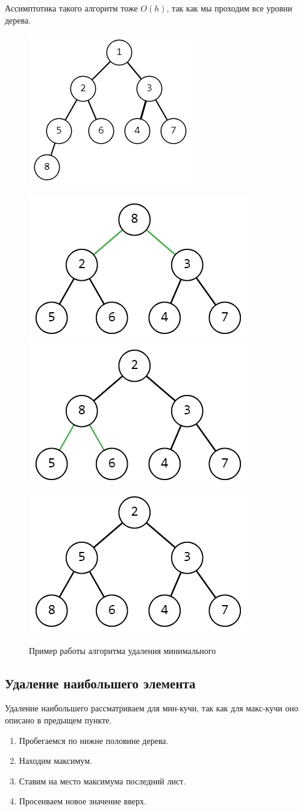 \documentclass{article}
\begin{document}
Ассимптотика такого алгоритм тоже $O(h)$, так как мы проходим все уровни дерева.

\begin{figure}[h]
    \centering
    \includegraphics[width=0.3\linewidth]{5.png}

    \includegraphics[width=0.3\linewidth]{6.png}
    \includegraphics[width=0.3\linewidth]{7.png}
    \includegraphics[width=0.3\linewidth]{8.png}
    \caption{Пример работы алгоритма удаления минимального}
    \label{fig:mpr}
\end{figure}

\subsection{Удаление наибольшего элемента}

Удаление наибольшего рассматриваем для мин-кучи, так как для макс-кучи оно описано в предыщем пункте.

\begin{enumerate}
    \item Пробегаемся по нижне половине дерева.
    \item Находим максимум.
    \item Ставим на место максимума последний лист.
    \item Просеиваем новое значение вверх.
\end{enumerate}
\end{document}
